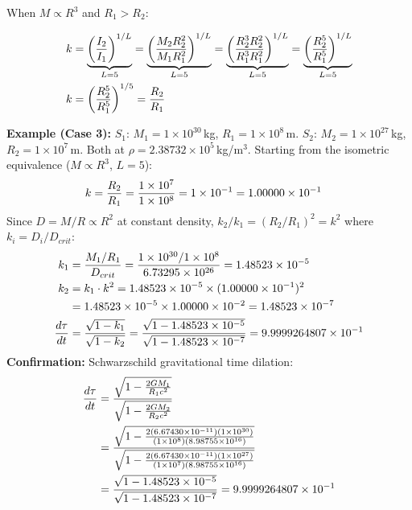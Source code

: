 \documentclass[twoside,twocolumn,9pt]{article}
\begin{document}
When $M \propto R^3$ and $R_1 > R_2$:

\begin{align}
k &= \underbrace{\left(\frac{I_2}{I_1}\right)^{1/L}}_{L=5}
= \underbrace{\left(\frac{M_2 R_2^2}{M_1 R_1^2}\right)^{1/L}}_{L=5}
= \underbrace{\left(\frac{R_2^3 R_2^2}{R_1^3 R_1^2}\right)^{1/L}}_{L=5}
= \underbrace{\left(\frac{R_2^5}{R_1^5}\right)^{1/L}}_{L=5} \notag \\
k &= \left(\frac{R_2^5}{R_1^5}\right)^{1/5}
= \frac{R_2}{R_1}
\end{align}

\begin{mdframed}
\textbf{Example (Case 3):} $S_1$: $M_1 = 1 \times 10^{30}$\,kg, $R_1 = 1 \times 10^{8}$\,m. $S_2$: $M_2 = 1 \times 10^{27}$\,kg, $R_2 = 1 \times 10^{7}$\,m. Both at $\rho = 2.38732 \times 10^{5}$\,kg/m$^3$. Starting from the isometric equivalence ($M \propto R^3$, $L = 5$):
\begin{align}
k &= \frac{R_2}{R_1}
= \frac{1 \times 10^{7}}{1 \times 10^{8}}
= 1 \times 10^{-1}
= 1.00000 \times 10^{-1} \notag
\end{align}
Since $D = M/R \propto R^2$ at constant density, $k_2/k_1 = (R_2/R_1)^2 = k^2$ where $k_i = D_i/D_{crit}$:
\begin{align}
k_1 &= \frac{M_1/R_1}{D_{crit}}
= \frac{1 \times 10^{30}/1 \times 10^{8}}{6.73295 \times 10^{26}}
= 1.48523 \times 10^{-5} \notag \\
k_2 &= k_1 \cdot k^2
= 1.48523 \times 10^{-5} \times (1.00000 \times 10^{-1})^2 \notag \\
&= 1.48523 \times 10^{-5} \times 1.00000 \times 10^{-2}
= 1.48523 \times 10^{-7} \notag \\
\frac{d\tau}{dt} &= \frac{\sqrt{1 - k_1}}{\sqrt{1 - k_2}}
= \frac{\sqrt{1 - 1.48523 \times 10^{-5}}}{\sqrt{1 - 1.48523 \times 10^{-7}}}
= 9.9999264807 \times 10^{-1} \notag
\end{align}
\textbf{Confirmation:} Schwarzschild gravitational time dilation:
\begin{align}
\frac{d\tau}{dt} &= \frac{\sqrt{1 - \frac{2GM_1}{R_1 c^2}}}{\sqrt{1 - \frac{2GM_2}{R_2 c^2}}} \notag \\
&= \frac{\sqrt{1 - \frac{2(6.67430 \times 10^{-11})(1 \times 10^{30})}{(1 \times 10^{8})(8.98755 \times 10^{16})}}}{\sqrt{1 - \frac{2(6.67430 \times 10^{-11})(1 \times 10^{27})}{(1 \times 10^{7})(8.98755 \times 10^{16})}}} \notag \\
&= \frac{\sqrt{1 - 1.48523 \times 10^{-5}}}{\sqrt{1 - 1.48523 \times 10^{-7}}}
= 9.9999264807 \times 10^{-1} \notag
\end{align}
\end{mdframed}
\end{document}
